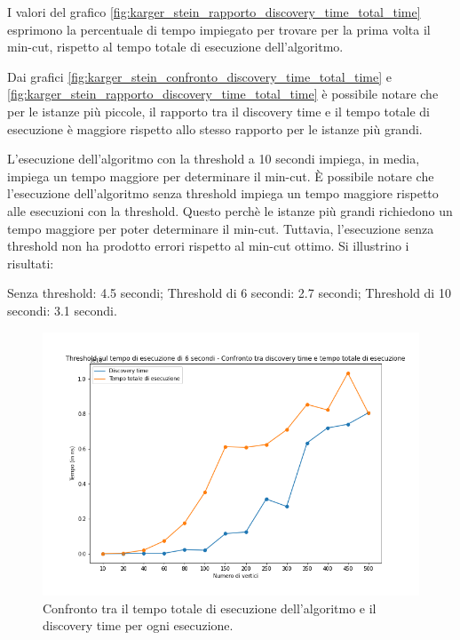 I valori del grafico \ref{fig:karger_stein_rapporto_discovery_time_total_time} 
esprimono la percentuale di tempo impiegato per trovare per la prima 
volta il min-cut, rispetto al tempo totale di esecuzione dell'algoritmo.

Dai grafici \ref{fig:karger_stein_confronto_discovery_time_total_time} 
e \ref{fig:karger_stein_rapporto_discovery_time_total_time} è possibile 
notare che per le istanze più piccole, il rapporto tra il discovery 
time e il tempo totale di esecuzione è maggiore rispetto allo stesso 
rapporto per le istanze più grandi.

L'esecuzione dell'algoritmo con la threshold a 10 secondi impiega, in media, 
impiega un tempo maggiore per determinare il min-cut. È possibile notare che 
l'esecuzione dell'algoritmo senza threshold impiega un tempo maggiore rispetto 
alle esecuzioni con la threshold. Questo perchè le istanze più grandi richiedono 
un tempo maggiore per poter determinare il min-cut. Tuttavia, l'esecuzione senza 
threshold non ha prodotto errori rispetto al min-cut ottimo. Si illustrino i 
risultati:

Senza threshold: 4.5 secondi;
Threshold di 6 secondi: 2.7 secondi;
Threshold di 10 secondi: 3.1 secondi.

\begin{figure}[H]
	\centering
	\includegraphics[width=1\textwidth]{res/images/single/karger-stein/discovery-time/threshold6/karger_stein_confronto_discovery_time_total_time_threshold_6s.png}
	\caption{Confronto tra il tempo totale di esecuzione dell'algoritmo e il discovery time per ogni esecuzione.}
	\label{fig:karger_stein_confronto_discovery_time_total_time_threshold_6s}
\end{figure}

